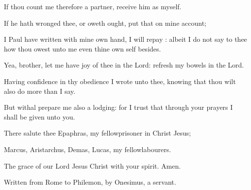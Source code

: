 {If thou
count
me
therefore a
partner,
receive
him
as
myself.

If he hath
wronged
thee,
or
oweth
{}
ought,
put
that on
mine
account;

I
Paul have
written
{} with mine
own
hand,
I will
repay
{}:
albeit I
do
not
say to
thee
how thou
owest unto
me
even thine own
self
besides.

Yea,
brother,
let
me have
joy of
thee
in the
Lord:
refresh
my
bowels
in the
Lord.


\par }{\PP {}Having
confidence
in
thy
obedience I
wrote unto
thee,
knowing
that thou wilt
also
do more
than I
say.

But
withal
prepare
me
also a
lodging:
for I
trust
that
through
your
prayers I shall be
given unto
you.


\par }{\PP {}There
salute
thee
Epaphras,
my
fellowprisoner
in
Christ
Jesus;

Marcus,
Aristarchus,
Demas,
Lucas,
my
fellowlabourers.

The
grace of
our
Lord
Jesus
Christ
{}
with
your
spirit.
Amen.


\par }{\SH Written from Rome to Philemon, by Onesimus, a servant.
\par }
